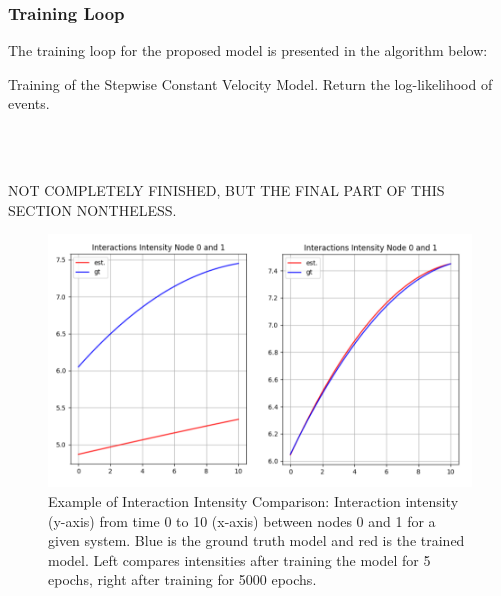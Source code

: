 


\subsubsection{Training Loop}
\label{sec:Method:Learning:TrainingLoop}
The training loop for the proposed model is presented in the algorithm below:

\begin{algorithm}[H] 
\caption{Training of the Stepwise Constant Velocity Model. Return the log-likelihood of events.}
\label{alg:TrainingLoop}
\begin{algorithmic}%
\Statex


    \EndFor
\EndFor
\\
    \EndFor
\EndFor
\\
\State {}
\EndFunction
\end{algorithmic}
\end{algorithm}
NOT COMPLETELY FINISHED, BUT THE FINAL PART OF THIS SECTION NONTHELESS.









\begin{figure}[H]
    \centering
    \includegraphics[width=\textwidth]{0_images/5vs5000epochs.png}
    \caption{Example of Interaction Intensity Comparison: Interaction intensity (y-axis) from time 0 to 10 (x-axis) between nodes 0 and 1 for a given system. Blue is the ground truth model and red is the trained model. Left compares intensities after training the model for 5 epochs, right after training for 5000 epochs.}
    \label{fig:5vs5000epochs}
\end{figure}